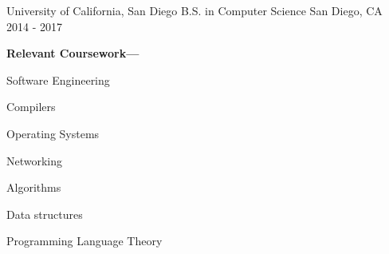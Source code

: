 

\begin{cventries}

  \cventry
    {University of California, San Diego} %
    {B.S. in Computer Science} %
    {San Diego, CA} %
    {2014 - 2017} %
    {
      \begin{cvitems} %
       \item 
       	 \textbf{Relevant Coursework---}
       	 \vspace{5mm} 
       	  \begin{cvitems}
       	  	\item Software Engineering
       	  	\item Compilers
       	  	\item Operating Systems
       	  	\item Networking
       	  	\item Algorithms
       	  	\item Data structures
       	  	\item Programming Language Theory
       	  \end{cvitems}
      \end{cvitems}
    }

\end{cventries}
